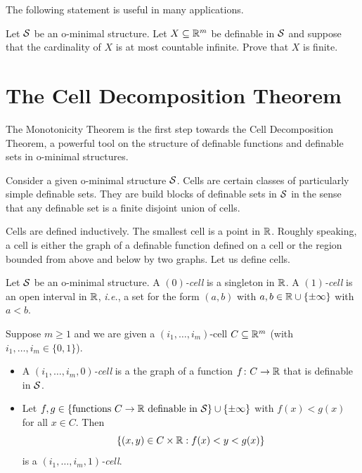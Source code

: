 The following statement is useful in many applications. 

\begin{exercise}
  Let ${\mathcal S}$ be an o-minimal structure. 
  Let $X\subseteq{\mathbb{R}}^m$ be definable in ${\mathcal S}$ and suppose that the
  cardinality of $X$ is at most countable infinite. Prove that $X$ is
  finite. 
\end{exercise}


\section{The Cell Decomposition Theorem}

The Monotonicity Theorem is the first step towards the Cell
Decomposition Theorem, a powerful tool on the structure of definable
functions and definable sets in o-minimal structures.

Consider a given o-minimal structure ${\mathcal S}$. Cells are certain classes of
particularly simple definable sets. They are build blocks of definable
sets in ${\mathcal S}$ in the sense that any definable set is a finite disjoint
union of cells.

Cells are defined inductively. The smallest cell is a point in ${\mathbb{R}}$.
Roughly speaking, a cell is either the graph of a
definable function defined on a cell or the region bounded from above
and below by two graphs. 
Let us define cells.

\begin{definition}
  Let ${\mathcal S}$ be an o-minimal structure. 
  A \emph{$(0)$-cell} is a singleton in ${\mathbb{R}}$. A \emph{$(1)$-cell} is an open
  interval in ${\mathbb{R}}$, \textit{i.e.}, a set for the form $(a,b)$ with
  $a,b\in {\mathbb{R}}\cup\{\pm\infty\}$ with $a<b$.

  Suppose $m\ge 1$ and we are given a $(i_1,\ldots,i_m)$-cell
  $C\subseteq{\mathbb{R}}^m$
  (with $i_1,\ldots,i_m\in
  \{0,1\}$).  
  \begin{itemize}
  \item A \emph{$(i_1,\ldots,i_m,0)$-cell} is a the graph of a function
    $f\colon C\rightarrow {\mathbb{R}}$ that is definable in ${\mathcal S}$.
  \item Let $f,g\in \{\text{functions }C\rightarrow {\mathbb{R}} \text{ definable
      in ${\mathcal S}$}\}\cup\{\pm\infty\}$  with $f(x) < g(x)$ for all $x\in C$. 
    Then
    \begin{equation*}
      \{(x,y)\in C\times {\mathbb{R}} : f(x) < y <
      g(x)  \}
    \end{equation*}
    is a \emph{$(i_1,\ldots,i_m,1)$-cell}.
  \end{itemize}
\end{definition}

